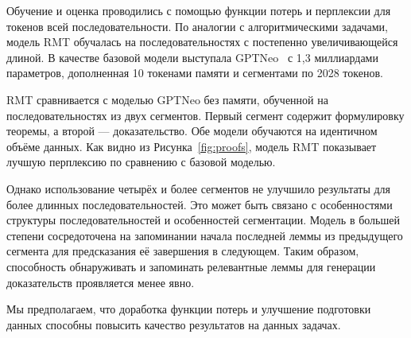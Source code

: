 Обучение и оценка проводились с помощью функции потерь и перплексии для токенов всей последовательности. По аналогии с алгоритмическими задачами, модель RMT обучалась на последовательностях с постепенно увеличивающейся длиной. В качестве базовой модели выступала GPTNeo~\cite{gpt-neo} с 1,3 миллиардами параметров, дополненная 10 токенами памяти и сегментами по 2028 токенов.

RMT сравнивается с моделью GPTNeo без памяти, обученной на последовательностях из двух сегментов. Первый сегмент содержит формулировку теоремы, а второй — доказательство. Обе модели обучаются на идентичном объёме данных. Как видно из Рисунка~\ref{fig:proofs}, модель RMT показывает лучшую перплексию по сравнению с базовой моделью.

Однако использование четырёх и более сегментов не улучшило результаты для более длинных последовательностей. Это может быть связано с особенностями структуры последовательностей и особенностей сегментации. Модель в большей степени сосредоточена на запоминании начала последней леммы из предыдущего сегмента для предсказания её завершения в следующем. Таким образом, способность обнаруживать и запоминать релевантные леммы для генерации доказательств проявляется менее явно.

Мы предполагаем, что доработка функции потерь и улучшение подготовки данных способны повысить качество результатов на данных задачах.